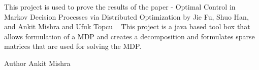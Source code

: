 This project is used to prove the results of the paper -\/ Optimal Control in Markov Decision Processes via Distributed Optimization by Jie Fu, Shuo Han, and Ankit Mishra and Ufuk Topcu ~\newline
This project is a java based tool box that allows formulation of a M\+D\+P and creates a decomposition and formulates sparse matrices that are used for solving the M\+D\+P. \begin{DoxyAuthor}{Author}
Ankit Mishra 
\end{DoxyAuthor}
